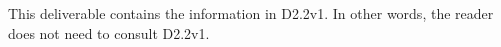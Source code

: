 \documentclass[a4paper, twoside, 11pt]{article}
\begin{document}
This deliverable contains the information in D2.2v1. In other words, the reader does not need to consult D2.2v1.

\clearpage

\tableofcontents
\clearpage
\listoffigures %




\clearpage
\sloppy





















\appendix
\clearpage
{}


\label{lastpage}
\end{document}
